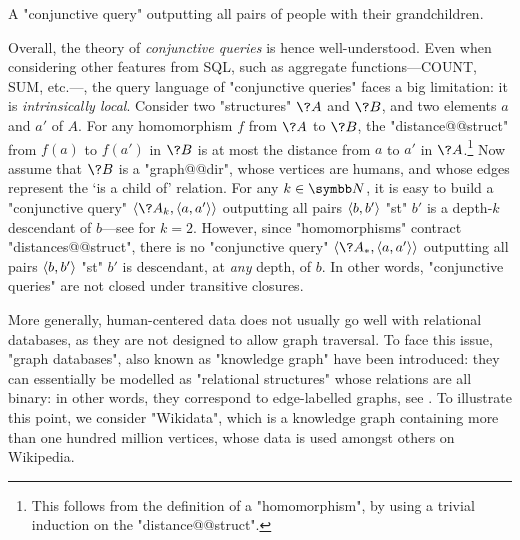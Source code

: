 \begin{marginfigure}
	\centering
	\caption{
		\AP\label{fig:CQ-grandchild}
		A "conjunctive query" outputting all pairs of people with their grandchildren.
	}
\end{marginfigure}
Overall, the theory of \emph{conjunctive queries} is hence well-understood.
Even when considering other features from SQL, such as aggregate functions---\textsf{COUNT}, \textsf{SUM}, etc.---, the query language of "conjunctive queries" faces a big limitation:
it is \emph{intrinsically local}.
Consider two "structures" $\?A$ and $\?B$, and two elements $a$ and $a'$ of $A$.
For any homomorphism $f$ from $\?A$ to $\?B$, the "distance@@struct" from $f(a)$ to $f(a')$
in $\?B$ is at most the distance from $a$ to $a'$ in $\?A$.\footnote{This follows from
the definition of a "homomorphism", by using a trivial induction on the "distance@@struct".}
Now assume that $\?B$ is a "graph@@dir", whose vertices are humans,
and whose edges represent the `is a child of' relation.
For any $k\in\N$, it is easy to build a "conjunctive query" $\tup{\?A_k, \tup{a, a'}}$
outputting all pairs $\langle b,b'\rangle$ "st" $b'$ is a depth-$k$ descendant of $b$---see
 for $k=2$.
However, since "homomorphisms" contract "distances@@struct", there is no
"conjunctive query" $\tup{\?A_*, \tup{a, a'}}$ outputting all pairs $\langle b,b'\rangle$
"st" $b'$ is descendant, at \emph{any} depth, of $b$.
In other words, "conjunctive queries" are not closed under transitive closures.

More generally, human-centered data does not usually go well with
relational databases, as they are not designed to allow graph traversal.
To face this issue, "graph databases", also known as "knowledge graph" have
been introduced: they can essentially be modelled
as "relational structures" whose relations are all binary: in other
words, they correspond to edge-labelled graphs, see .
To illustrate this point, we consider
"Wikidata", which is a knowledge graph containing more than one hundred million
vertices, whose data is used amongst others on Wikipedia. 

